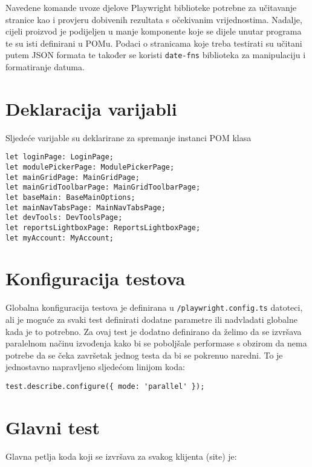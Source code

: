 Navedene komande uvoze djelove Playwright biblioteke potrebne za učitavanje stranice kao i provjeru dobivenih rezultata s očekivanim vrijednostima.
Nadalje, cijeli proizvod je podijeljen u manje komponente koje se dijele unutar programa te su isti definirani u POMu.
Podaci o stranicama koje treba testirati su učitani putem JSON formata te također se koristi \texttt{date-fns} biblioteka za manipulaciju i formatiranje datuma.

\section{Deklaracija varijabli}
Sljedeće varijable su deklarirane za spremanje instanci POM klasa

\begin{verbatim}
let loginPage: LoginPage;
let modulePickerPage: ModulePickerPage;
let mainGridPage: MainGridPage;
let mainGridToolbarPage: MainGridToolbarPage;
let baseMain: BaseMainOptions;
let mainNavTabsPage: MainNavTabsPage;
let devTools: DevToolsPage;
let reportsLightboxPage: ReportsLightboxPage;
let myAccount: MyAccount;
\end{verbatim}

\section{Konfiguracija testova}
Globalna konfiguracija testova je definirana u \texttt{/playwright.config.ts} datoteci, ali je moguće za svaki test definirati dodatne parametre ili nadvladati globalne kada je to potrebno.
Za ovaj test je dodatno definirano da želimo da se izvršava paralelnom načinu izvođenja kako bi se poboljšale performase s obzirom da nema potrebe da se čeka završetak jednog testa da bi se pokrenuo naredni.
To je jednostavno napravljeno sljedećom linijom koda:
\begin{verbatim}
test.describe.configure({ mode: 'parallel' });
\end{verbatim}

\section{Glavni test}
Glavna petlja koda koji se izvršava za svakog klijenta (site) je:

